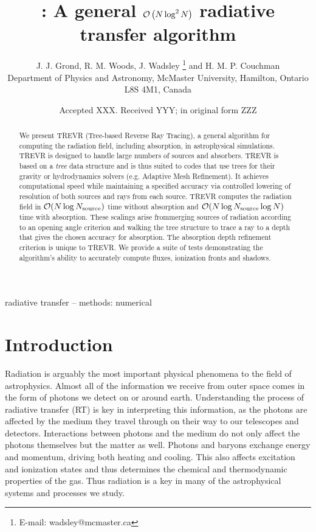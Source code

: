 \documentclass[fleq,usenatbib]{mnras}
\title[]{\acro{}: A general $\mathcal{O}\left(N\log^2N\right)$ radiative transfer algorithm}
\author[J. J. Grond et al.]{
J. J. Grond,
R. M. Woods,
J. Wadsley \thanks{E-mail:  wadsley@mcmaster.ca}
and H. M. P. Couchman
\\
Department of Physics and Astronomy, McMaster University, Hamilton, Ontario L8S
 4M1, Canada}
\date{Accepted XXX. Received YYY; in original form ZZZ}
\newcommand{\acro}{TREVR}
\newcommand{\NS}{N_{\rm source}}
\begin{document}
\label{firstpage}
\pagerange{\pageref{firstpage}--\pageref{lastpage}}
\maketitle

\begin{abstract}
We present \acro{} (Tree-based Reverse Ray Tracing), a general algorithm for 
computing the radiation field, including absorption, in astrophysical 
simulations. \acro{} is designed to handle large numbers of sources and 
absorbers. \acro{} is based on a \emph{tree} data structure and is thus suited 
to codes that use trees for their gravity or hydrodynamics solvers (e.g. 
Adaptive Mesh Refinement). It achieves computational speed while maintaining a 
specified accuracy via controlled lowering of resolution of both sources and rays from each source. \acro{} computes the radiation field in $\mathcal{O}(N 
\log \NS)$ time without absorption and $\mathcal{O}(N \log \NS \log{N})$ time 
with absorption.  These scalings arise frommerging sources of radiation 
according to an opening angle criterion and walking the tree structure to 
trace a ray to a depth that gives the chosen accuracy for absorption. The 
absorption depth refinement criterion is unique to \acro{}. We provide a suite 
of tests demonstrating the algorithm's ability to accurately compute fluxes, 
ionization fronts and shadows.   

\end{abstract}

\begin{keywords}
radiative transfer -- methods: numerical
\end{keywords}



\section{Introduction}\label{sec:intr}
Radiation is arguably the most important physical phenomena to the field of
astrophysics. Almost all of the information we receive from outer space comes 
in the form of photons we detect on or around earth. Understanding the process 
of radiative transfer (RT) is key in interpreting this information, as the 
photons are affected by the medium they travel through on their way to our 
telescopes and detectors. Interactions between photons and the medium do not 
only affect the photons themselves but the matter as well. Photons and baryons 
exchange energy and momentum, driving both heating and cooling.
This also affects excitation and ionization states 
and thus determines the chemical and thermodynamic properties of 
the gas.  Thus radiation is a key in many of the 
astrophysical systems and processes we study.
\end{document}
